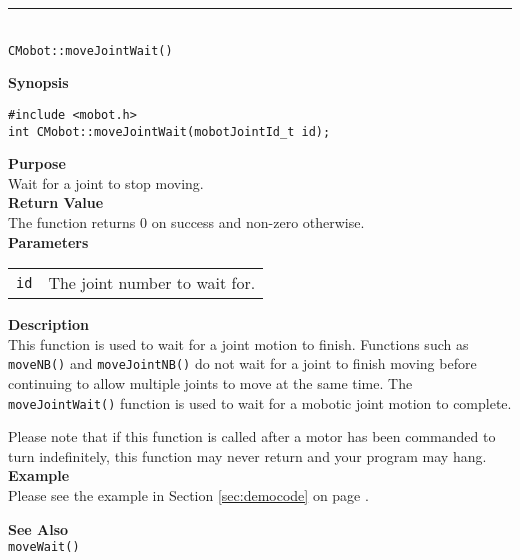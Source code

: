 \noindent
\vspace{5pt}
\rule{4.5in}{0.015in}\\
\noindent
{\LARGE \texttt{CMobot::moveJointWait()}}\\
{}

\noindent
{\bf Synopsis}
\vspace{-8pt}
\begin{verbatim}
#include <mobot.h>
int CMobot::moveJointWait(mobotJointId_t id);
\end{verbatim}

\noindent
{\bf Purpose}\\
Wait for a joint to stop moving.\\

\noindent
{\bf Return Value}\\
The function returns 0 on success and non-zero otherwise.\\

\noindent
{\bf Parameters}
\vspace{-0.1in}
\begin{description}
\item               
\begin{tabular}{p{10 mm}p{145 mm}}
\texttt{id} & The joint number to wait for. \\
\end{tabular}
\end{description}

\noindent
{\bf Description}\\
This function is used to wait for a joint motion to finish. Functions such as
\texttt{moveNB()} and \texttt{moveJointNB()} do not wait for a joint to finish
moving before continuing to allow multiple joints to move at the same time. The
\texttt{moveJointWait()} function is used to wait for a 
mobotic joint motion to complete.

Please note that if this function is called after a motor has been commanded to
turn indefinitely, this function may never return and your program may hang.\\

\noindent
{\bf Example}\\
Please see the example in Section \ref{sec:democode} on page \pageref{sec:democode}.\\
\noindent

\noindent
{\bf See Also}\\
\texttt{moveWait()}

